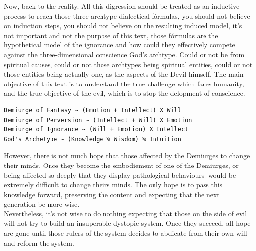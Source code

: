 \documentclass[12pt,a4paper]{article}
\begin{document}
\hspace{\baselineskip}

Now, back to the reality. All this digression should be treated as an inductive process to reach those three archtype dialectical fórmulas, you should not believe on induction steps, you should not believe on the resulting induced model, it's not important and not the purpose of this text, those fórmulas are the hypothetical model of the ignorance and how could they effectively compete against the three-dimensional conscience God's archtype. Could or not be from spiritual causes, could or not those archtypes being spiritual entities, could or not those entities being actually one, as the aspects of the Devil himself. The main objective of this text is to understand the true challenge which faces humanity, and the true objective of the evil, which is to stop the delopment of conscience. \\

\begin{lstlisting}
Demiurge of Fantasy ~ (Emotion + Intellect) X Will 
Demiurge of Perversion ~ (Intellect + Will) X Emotion 
Demiurge of Ignorance ~ (Will + Emotion) X Intellect
God's Archetype ~ (Knowledge % Wisdom) % Intuition
\end{lstlisting}

\hspace{\baselineskip}

However, there is not much hope that those affected by the Demiurges to change their minds. Once they become the embodiement of one of the Demiurges, or being affected so deeply that they display pathological behaviours, would be extremely difficult to change theirs minds. The only hope is to pass this knowledge forward, preserving the content and expecting that the next generation be more wise.\\

Nevertheless, it's not wise to do nothing expecting that those on the side of evil will not try to build an insuperable dystopic system. Once they succeed, all hope are gone until those rulers of the system decides to abdicate from their own will and reform the system.
\end{document}
